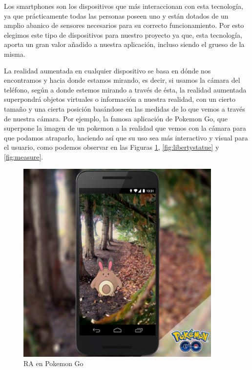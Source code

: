 Los smartphones son los dispositivos que más interaccionan con esta tecnología, ya que prácticamente todas las personas poseen uno
 y están dotados de un amplio abanico de sensores necesarios para su correcto funcionamiento. Por esto elegimos este tipo de dispositivos para nuestro
 proyecto ya que, esta tecnología, aporta un gran valor añadido a nuestra aplicación, incluso siendo el grueso de la misma. 

 La realidad aumentada en cualquier dispositivo se basa en dónde nos encontramos y hacia donde estamos mirando, es decir, si usamos la cámara del teléfono,
 según a donde estemos mirando a través de ésta, la realidad aumentada superpondrá objetos virtuales o información a nuestra realidad, con un cierto tamaño y una cierta posición
 basándose en las medidas de lo que vemos a través de nuestra cámara. Por ejemplo, la famosa aplicación de Pokemon Go, que superpone la imagen de un pokemon a la realidad
 que vemos con la cámara para que podamos atraparlo, haciendo así que su uso sea más interactivo y visual para el usuario, como podemos observar en las Figuras \ref{fig:pokemon}, \ref{fig:libertystatue} y \ref{fig:measure}.

 \begin{figure}[H]
    \centering
    \includegraphics[width=4in]{figures/chapter-2/pokemongo.png}
    \caption{RA en Pokemon Go\cite{pokemongo}}
    \label{fig:pokemon}
\end{figure}

